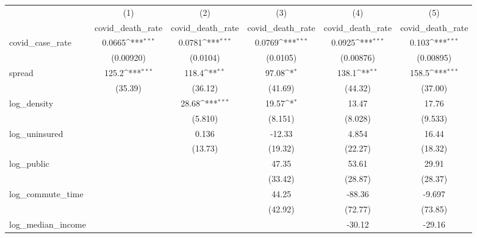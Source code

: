 {
\def\sym#1{\ifmmode^{#1}\else\(^{#1}\)\fi}
\begin{tabular}{l*{5}{c}}
\hline\hline
            &\multicolumn{1}{c}{(1)}&\multicolumn{1}{c}{(2)}&\multicolumn{1}{c}{(3)}&\multicolumn{1}{c}{(4)}&\multicolumn{1}{c}{(5)}\\
            &\multicolumn{1}{c}{covid\_death\_rate}&\multicolumn{1}{c}{covid\_death\_rate}&\multicolumn{1}{c}{covid\_death\_rate}&\multicolumn{1}{c}{covid\_death\_rate}&\multicolumn{1}{c}{covid\_death\_rate}\\
\hline
covid\_case\_rate&      0.0665\sym{***}&      0.0781\sym{***}&      0.0769\sym{***}&      0.0925\sym{***}&       0.103\sym{***}\\
            &   (0.00920)         &    (0.0104)         &    (0.0105)         &   (0.00876)         &   (0.00895)         \\
[1em]
spread      &       125.2\sym{***}&       118.4\sym{**} &       97.08\sym{*}  &       138.1\sym{**} &       158.5\sym{***}\\
            &     (35.39)         &     (36.12)         &     (41.69)         &     (44.32)         &     (37.00)         \\
[1em]
log\_density &                     &       28.68\sym{***}&       19.57\sym{*}  &       13.47         &       17.76         \\
            &                     &     (5.810)         &     (8.151)         &     (8.028)         &     (9.533)         \\
[1em]
log\_uninsured&                     &       0.136         &      -12.33         &       4.854         &       16.44         \\
            &                     &     (13.73)         &     (19.32)         &     (22.27)         &     (18.32)         \\
[1em]
log\_public  &                     &                     &       47.35         &       53.61         &       29.91         \\
            &                     &                     &     (33.42)         &     (28.87)         &     (28.37)         \\
[1em]
log\_commute\_time&                     &                     &       44.25         &      -88.36         &      -9.697         \\
            &                     &                     &     (42.92)         &     (72.77)         &     (73.85)         \\
[1em]
log\_median\_income&                     &                     &                     &      -30.12         &      -29.16         \\

\end{tabular}}
